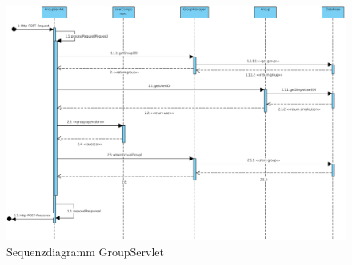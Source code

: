 \begin{figure}[h]
     \centering
     \hspace*{-2cm}\includegraphics[scale=0.5, trim=2 2 2 2, clip=true]{servergraphs/sequenz-server.pdf}
     \caption{Sequenzdiagramm GroupServlet}
\end{figure}
\clearpage

